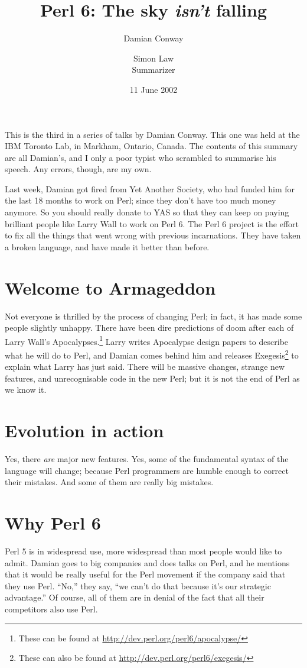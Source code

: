 \documentclass{article}
\title{Perl 6: The sky \emph{isn't} falling}
\author{Damian Conway \and Simon Law\\Summarizer}
\date{11 June 2002}
\begin{document}
\maketitle

\noindent This is the third in a series of talks by Damian Conway.  This
one was held at the IBM Toronto Lab, in Markham, Ontario, Canada.  The
contents of this summary are all Damian's, and I only a poor typist who
scrambled to summarise his speech.  Any errors, though, are my own.

Last week, Damian got fired from Yet Another Society, who had funded him
for the last 18 months to work on Perl; since they don't have too much
money anymore.  So you should really donate to YAS so that they can keep
on paying brilliant people like Larry Wall to work on Perl 6.  The Perl
6 project is the effort to fix all the things that went wrong with
previous incarnations.  They have taken a broken language, and have made
it better than before.

\section{Welcome to Armageddon}
Not everyone is thrilled by the process of changing Perl; in fact, it
has made some people slightly unhappy.  There have been dire predictions
of doom after each of Larry Wall's Apocalypses.\footnote{These can be
found at \url{http://dev.perl.org/perl6/apocalypse/}}  Larry writes
Apocalypse design papers to describe what he will do to Perl, and Damian
comes behind him and releases Exegesis\footnote{These can also be found
at \url{http://dev.perl.org/perl6/exegesis/}} to explain what Larry has
just said.  There will be massive changes, strange new features, and
unrecognisable code in the new Perl; but it is not the end of Perl as we
know it.

\section{Evolution in action}
Yes, there \emph{are} major new features.  Yes, some of the fundamental
syntax of the language will change; because Perl programmers are humble
enough to correct their mistakes.  And some of them are really big
mistakes.

\section{Why Perl 6}
Perl 5 is in widespread use, more widespread than most people would like
to admit.  Damian goes to big companies and does talks on Perl, and he
mentions that it would be really useful for the Perl movement if the
company said that they use Perl.  ``No,'' they say, ``we can't do that
because it's our strategic advantage.''  Of course, all of them are in
denial of the fact that all their competitors also use Perl.
\end{document}
